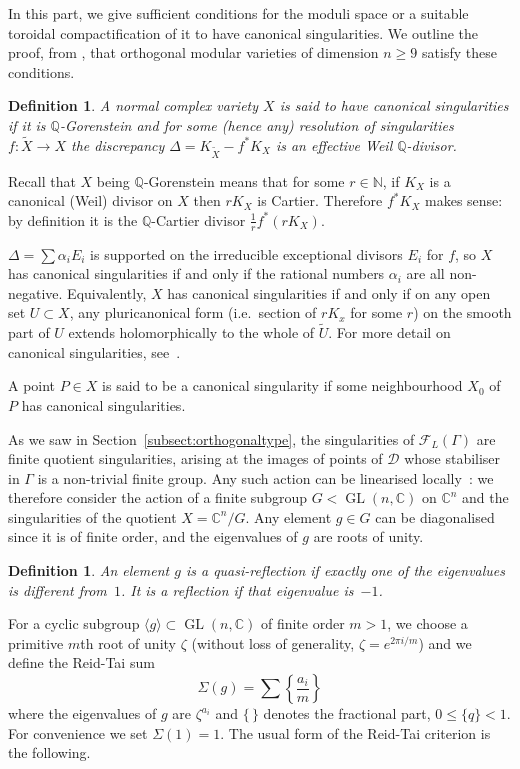 \documentclass[a4paper,11pt]{article}
\newtheorem{definition}[lemma]{Definition}
\newcommand{\CC}{\mathbb C}
\newcommand{\NN}{\mathbb N}
\newcommand{\QQ}{\mathbb Q}
\renewcommand{\cD}{\mathcal D}
\newcommand{\cF}{\mathcal F}
\renewcommand{\Tilde}{\widetilde}
\newcommand{\GL}{\mathop{\mathrm {GL}}\nolimits}
\newcommand{\latt}[1]{{\langle{#1}\rangle}}
\begin{document}
In this part, we give sufficient conditions for the moduli space or a
suitable toroidal compactification of it to have canonical
singularities. We outline the proof, from \cite[Section~2]{GHSK3},
that orthogonal modular varieties of dimension $n\ge 9$ satisfy these
conditions.

\begin{definition}\label{def:cansings}
A normal complex variety $X$ is said to have \emph{canonical singularities}
if it is $\QQ$-Gorenstein and for some (hence any) resolution of
singularities $f\colon \Tilde X\to X$ the discrepancy
$\Delta=K_{\Tilde X}-f^* K_X$
is an effective Weil $\QQ$-divisor.
\end{definition}
Recall that $X$ being $\QQ$-Gorenstein means that for some $r\in\NN$,
if $K_X$ is a canonical (Weil) divisor on $X$ then $rK_X$ is
Cartier. Therefore $f^*K_X$ makes sense: by definition it is the
$\QQ$-Cartier divisor $\frac{1}{r}f^*(rK_X)$.

$\Delta=\sum \alpha_i E_i$ is supported on the irreducible exceptional
divisors $E_i$ for $f$, so $X$ has canonical singularities if and only
if the rational numbers $\alpha_i$ are all non-negative. Equivalently,
$X$ has canonical singularities if and only if on any open set
$U\subset X$, any pluricanonical form (i.e.\ section of $rK_x$ for
some $r$) on the smooth part of $U$ extends holomorphically to the
whole of $\Tilde U$. For more detail on canonical singularities,
see~\cite{YPG}.

A point $P\in X$ is said to be a canonical singularity if some
neighbourhood $X_0$ of $P$ has canonical singularities.

As we saw in Section~\ref{subsect:orthogonaltype}, the singularities
of $\cF_L(\Gamma)$ are finite quotient singularities, arising at the images of
points of $\cD$ whose stabiliser in $\Gamma$ is a non-trivial finite
group. Any such action can be linearised locally~\cite{Ca}: we
therefore consider the action of a finite subgroup $G<\GL(n,\CC)$ on
$\CC^n$ and the singularities of the quotient $X=\CC^n/G$. Any element
$g\in G$ can be diagonalised since it is of finite order, and the
eigenvalues of $g$ are roots of unity.

\begin{definition}\label{def:qref}
An element $g$ is a \emph{quasi-reflection} if exactly one of the
eigenvalues is different from~$1$. It is a \emph{reflection} if that
eigenvalue is~$-1$.
\end{definition}

For a cyclic subgroup $\latt{g}\subset \GL(n,\CC)$ of finite order
$m>1$, we choose a primitive $m$th root of unity $\zeta$ (without loss
of generality, $\zeta=e^{2\pi i/m}$) and we define the Reid-Tai sum
\begin{equation}\label{RTsum}
\Sigma(g)=\sum\left\{\frac{a_i}{m}\right\}
\end{equation}
where the eigenvalues of $g$ are $\zeta^{a_i}$ and $\{\,\}$ denotes
the fractional part, $0\le \{q\}<1$. For convenience we set
$\Sigma(1)=1$. The usual form of the
Reid-Tai criterion is the following.
\end{document}
